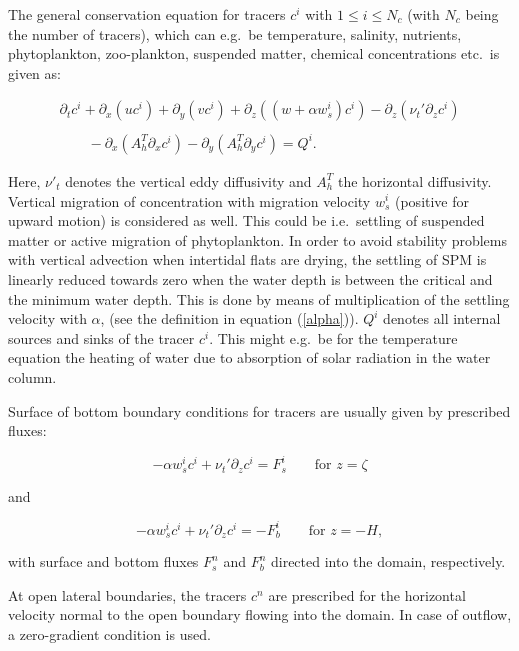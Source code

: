 The general conservation equation for tracers $c^i$ with $1\leq i \leq N_c$
(with $N_c$ being the number of tracers), 
which can e.g.\ be temperature,
salinity, nutrients, phytoplankton, zoo-plankton, suspended matter,
chemical concentrations etc.\ is given as:

\begin{equation}\label{densz}
\begin{array}{l}
\partial_t c^i +\partial_x (uc^i) +\partial_y(vc^i) 
+\partial_z ((w+\alpha w_s^i)c^i)
-\partial_z(\nu_t' \partial_z c^i)
\\ \\ \displaystyle \qquad
-\partial_x(A_h^T \partial_x c^i)
-\partial_y(A_h^T \partial_y c^i)
=Q^i.
\end{array} 
\end{equation}

Here, $\nu'_t$ denotes the vertical eddy diffusivity and
$A_h^T$ the horizontal diffusivity.
Vertical migration of concentration with migration velocity
$w_s^i$ (positive for upward motion) is considered as well. This could be 
i.e.\ settling of suspended matter or active migration of
phytoplankton.  
In order to avoid stability problems with vertical advection when 
intertidal flats are drying, the settling of SPM is linearly 
reduced towards zero when the water
depth is between the critical and the minimum water depth. 
This is
done by means of multiplication of the settling velocity with $\alpha$,
(see the definition in equation (\ref{alpha})).
$Q^i$ denotes all internal sources and sinks of the tracer $c^i$.
This might e.g.\ be for the temperature equation the heating of water
due to absorption of solar radiation in the water column.

Surface of bottom boundary conditions for tracers are usually given
by prescribed fluxes:

\begin{equation}\label{SurfFlux}
-\alpha w_s^i c^i+\nu_t' \partial_z c^i = F^i_s  \qquad \mbox{for } z=\zeta
\end{equation}

and 

\begin{equation}\label{BottFlux}
-\alpha w_s^i c^i+\nu_t' \partial_z c^i = -F^i_b  \qquad \mbox{for } z=-H,
\end{equation}

with surface and bottom fluxes $F^n_s$ and $F^n_b$ directed
into the domain, respectively. 

At open lateral boundaries, the tracers $c^n$ are prescribed for
the horizontal velocity normal to the open boundary 
flowing into the domain. In case of outflow, a zero-gradient condition is
used. 

